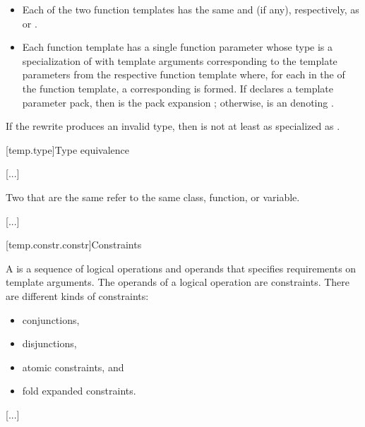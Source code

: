 \documentclass{wg21}
\begin{document}
\begin{itemize}
\item
Each of the two function templates has the same 
and  (if any),
respectively, as  or .
\item
Each function template has a single function parameter
whose type is a specialization of 
with template arguments corresponding to the template parameters
from the respective function template where,
for each  
in the  of the function template,
a corresponding   is formed.
If  declares a template parameter pack,
then  is the pack expansion ;
otherwise,  is an  denoting .
\end{itemize}
If the rewrite produces an invalid type,
then  is not at least as specialized as .

[temp.type]{Type equivalence}

\textcolor{noteclr}{[...]}

Two  that are the same
refer to the same class, function, or variable.

\textcolor{noteclr}{[...]}

[temp.constr.constr]{Constraints}

\pnum
A  is a sequence of logical operations and
operands that specifies requirements on template arguments.
The operands of a logical operation are constraints.
There are  different kinds of constraints:
\begin{itemize}
    \item conjunctions,
    \item disjunctions,
    \item atomic constraints, and
    \item fold expanded constraints.
\end{itemize}

\textcolor{noteclr}{[...]}
\end{document}
